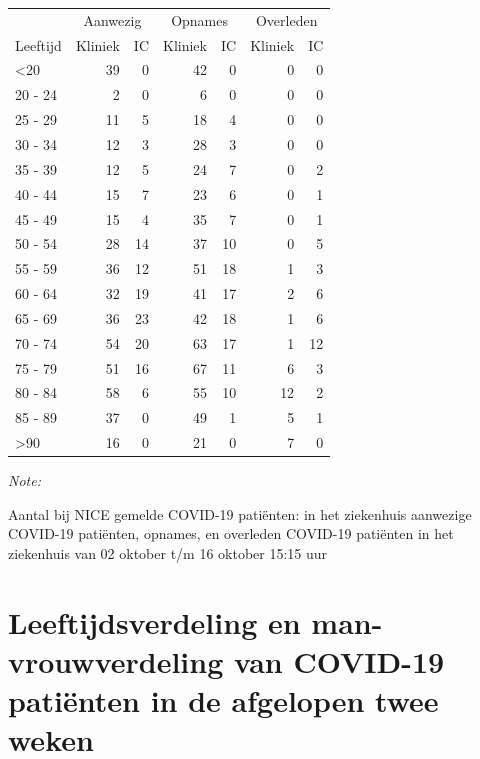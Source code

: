 \documentclass[
  english,
  man,floatsintext]{apa6}
\begin{document}
\begin{table}
\centering\begingroup\fontsize{10}{12}\selectfont

\begin{threeparttable}
\begin{tabular}{lrrrrrr}
\toprule
\multicolumn{1}{c}{ } & \multicolumn{2}{c}{Aanwezig} & \multicolumn{2}{c}{Opnames} & \multicolumn{2}{c}{Overleden} \\
\cmidrule(l{3pt}r{3pt}){2-3} \cmidrule(l{3pt}r{3pt}){4-5} \cmidrule(l{3pt}r{3pt}){6-7}
Leeftijd & Kliniek & IC & Kliniek & IC & Kliniek & IC\\
\midrule
<20 & 39 & 0 & 42 & 0 & 0 & 0\\
20 - 24 & 2 & 0 & 6 & 0 & 0 & 0\\
25 - 29 & 11 & 5 & 18 & 4 & 0 & 0\\
30 - 34 & 12 & 3 & 28 & 3 & 0 & 0\\
35 - 39 & 12 & 5 & 24 & 7 & 0 & 2\\
40 - 44 & 15 & 7 & 23 & 6 & 0 & 1\\
45 - 49 & 15 & 4 & 35 & 7 & 0 & 1\\
50 - 54 & 28 & 14 & 37 & 10 & 0 & 5\\
55 - 59 & 36 & 12 & 51 & 18 & 1 & 3\\
60 - 64 & 32 & 19 & 41 & 17 & 2 & 6\\
65 - 69 & 36 & 23 & 42 & 18 & 1 & 6\\
70 - 74 & 54 & 20 & 63 & 17 & 1 & 12\\
75 - 79 & 51 & 16 & 67 & 11 & 6 & 3\\
80 - 84 & 58 & 6 & 55 & 10 & 12 & 2\\
85 - 89 & 37 & 0 & 49 & 1 & 5 & 1\\
>90 & 16 & 0 & 21 & 0 & 7 & 0\\
\bottomrule
\end{tabular}
\begin{tablenotes}
\item \textit{Note: } 
\item Aantal bij NICE gemelde COVID-19 patiënten: in het ziekenhuis aanwezige COVID-19 patiënten, opnames, en overleden COVID-19 patiënten in het ziekenhuis van 02 oktober t/m 16 oktober 15:15 uur
\end{tablenotes}
\end{threeparttable}
\endgroup{}
\end{table}

\newpage

\hypertarget{leeftijdsverdeling-en-man-vrouwverdeling-van-covid-19-patiuxebnten-in-de-afgelopen-twee-weken}{%
\section{Leeftijdsverdeling en man-vrouwverdeling van COVID-19 patiënten in de afgelopen twee weken}\label{leeftijdsverdeling-en-man-vrouwverdeling-van-covid-19-patiuxebnten-in-de-afgelopen-twee-weken}}
\end{document}
